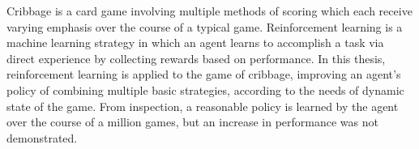 

Cribbage is a card game involving multiple methods of scoring
which each receive varying emphasis
over the course of a typical game.
%
Reinforcement learning is a machine learning strategy in which an agent learns
to accomplish a task via direct experience
by collecting rewards based on performance.
%
In this thesis,
reinforcement learning is applied to the game of cribbage,
improving an agent's policy of combining multiple basic strategies,
according to the needs of dynamic state of the game.
%
From inspection,
a reasonable policy is learned by the agent over the course of a million games,
but an increase in performance was not demonstrated.
